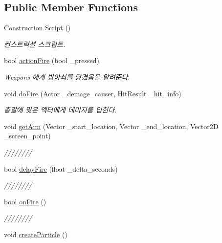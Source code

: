 \subsection*{Public Member Functions}
\begin{DoxyCompactItemize}
\item 
Construction \hyperlink{class_weapons___actor_a47da85d09a9191edbee8f5454f8a5118}{Script} ()
\begin{DoxyCompactList}\small\item\em 컨스트럭션 스크립트. \end{DoxyCompactList}\item 
bool \hyperlink{class_weapons___actor_a386d7f1cdcdd6f989cbd91a4612094c9}{action\+Fire} (bool \+\_\+pressed)
\begin{DoxyCompactList}\small\item\em Weapons 에게 방아쇠를 당겼음을 알려준다. \end{DoxyCompactList}\item 
void \hyperlink{class_weapons___actor_ab19a4d70050baea3347948f457b4316f}{do\+Fire} (Actor \+\_\+demage\+\_\+causer, Hit\+Result \+\_\+hit\+\_\+info)
\begin{DoxyCompactList}\small\item\em 총알에 맞은 엑터에게 데미지를 입힌다. \end{DoxyCompactList}\item 
void \hyperlink{class_weapons___actor_afeff0a9b2ae132677c1f268b305852f0}{get\+Aim} (Vector \+\_\+start\+\_\+location, Vector \+\_\+end\+\_\+location, Vector2D \+\_\+screen\+\_\+point)
\begin{DoxyCompactList}\small\item\em //////// \end{DoxyCompactList}\item 
bool \hyperlink{class_weapons___actor_a8fca2bbfe8830abe9feec1ee82565a1e}{delay\+Fire} (float \+\_\+delta\+\_\+seconds)
\begin{DoxyCompactList}\small\item\em //////// \end{DoxyCompactList}\item 
bool \hyperlink{class_weapons___actor_a222c02127cd7ec162e747a382bc3acb9}{on\+Fire} ()
\begin{DoxyCompactList}\small\item\em //////// \end{DoxyCompactList}\item 
void \hyperlink{class_weapons___actor_a89dec27e708d9944b1f4f17c5b6da210}{create\+Particle} ()

\end{DoxyCompactItemize}
